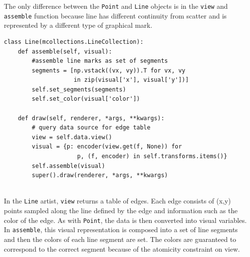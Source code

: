 \documentclass[../main.tex]{subfiles}
\begin{document}
The only difference between the \texttt{Point} and \texttt{Line} objects is in the \texttt{view} and \texttt{assemble} function because line has different continuity from scatter and is represented by a different type of graphical mark. 

\begin{verbatim}
class Line(mcollections.LineCollection):
    def assemble(self, visual):
        #assemble line marks as set of segments 
        segments = [np.vstack((vx, vy)).T for vx, vy 
                    in zip(visual['x'], visual['y'])]
        self.set_segments(segments)
        self.set_color(visual['color'])
        
    def draw(self, renderer, *args, **kwargs):
        # query data source for edge table
        view = self.data.view()
        visual = {p: encoder(view.get(f, None)) for 
                     p, (f, encoder) in self.transforms.items()}
        self.assemble(visual)
        super().draw(renderer, *args, **kwargs)


\end{verbatim}
In the \texttt{Line} artist, \texttt{view} returns a table of edges. Each edge consists of (x,y) points sampled along the line defined by the edge and information such as the color of the edge. As with \texttt{Point}, the data is then converted into visual variables. In \texttt{assemble}, this visual representation is composed into a set of line segments and then the colors of each line segment are set. The colors are guaranteed to correspond to the correct segment because of the atomicity constraint on view. 
\end{document}
